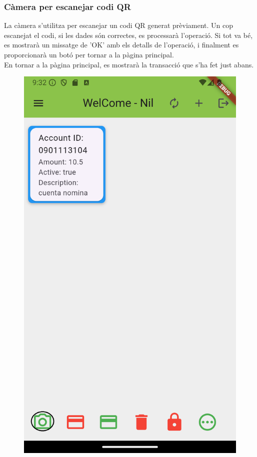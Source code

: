 \documentclass[a4paper,12pt,twoside]{ThesisStyle}
\begin{document}
\clearpage

\subsubsection{Càmera per escanejar codi QR}
\label{subsubsec:Càmera per escanejar codi QR}

La càmera s'utilitza per escanejar un codi QR generat prèviament. Un cop escanejat el codi, si les dades són correctes, es processarà l'operació. Si tot va bé, es mostrarà un missatge de 'OK' amb els detalls de l'operació, i finalment es proporcionarà un botó per tornar a la pàgina principal.\\

En tornar a la pàgina principal, es mostrarà la transacció que s'ha fet just abans.

\begin{figure}[h]
    \centering
    \begin{minipage}{0.31\textwidth}
        \includegraphics[width=\linewidth]{imatges/mainpageAccount1.png}

\end{minipage}
\end{figure}
\end{document}
